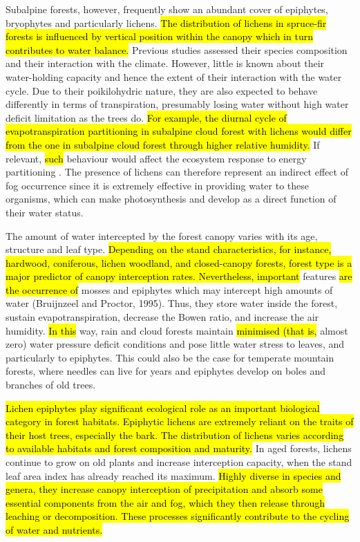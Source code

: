 \documentclass[10pt,letterpaper]{article}
\begin{document}
Subalpine forests, however, frequently show an abundant cover of epiphytes, bryophytes and particularly lichens. \hl{ The distribution of lichens in spruce-fir forests is influenced by vertical position within the canopy which in turn contributes to water balance. }Previous studies assessed their species composition and their interaction with the climate. However, little is known about their water-holding capacity and hence the extent of their interaction with the water cycle. Due to their poikilohydric nature, they are also expected to behave differently in terms of transpiration, presumably losing water without high water deficit limitation as the trees do. \hl{For example, the diurnal cycle of evapotranspiration partitioning in subalpine cloud forest with lichens would differ from the one in subalpine cloud forest through higher relative humidity.} If relevant, \hl{such} behaviour would affect the ecosystem response to energy partitioning \cite{Poradaetal2018}. The presence of lichens can therefore represent an indirect effect of fog occurrence since it is extremely effective in providing water to these organisms, which can make photosynthesis and develop as a direct function of their water status.

The amount of water intercepted by the forest canopy varies with its age, structure and leaf type. \hl{Depending on the stand characteristics, for instance, hardwood, coniferous, lichen woodland, and closed-canopy forests, forest type is a major predictor of canopy interception rates. Nevertheless, important} features \hl{are the occurrence of} mosses and epiphytes which may intercept high amounts of water (Bruijnzeel and Proctor, 1995). Thus, they store water inside the forest, sustain evapotranspiration, decrease the Bowen ratio, and increase the air humidity. \hl{In this} way, rain and cloud forests maintain \hl{minimised (that is, }almost zero) water pressure deficit conditions and pose little water stress to leaves, and particularly to epiphytes. This could also be the case for temperate mountain forests, where needles can live for years and epiphytes develop on boles and branches of old trees. 

\hl{Lichen epiphytes play significant ecological role as an important biological category in forest habitats. Epiphytic lichens are extremely reliant on the traits of their host trees, especially the bark. The distribution of lichens varies according to available habitats and forest composition and maturity.} In aged forests, lichens continue to grow on old plants and increase interception capacity, when the stand leaf area index has already reached its maximum. \hl{Highly diverse in species and genera, they increase canopy interception of precipitation and absorb some essential components from the air and fog, which they then release through leaching or decomposition. These processes significantly contribute to the cycling of water and nutrients.}
\end{document}
